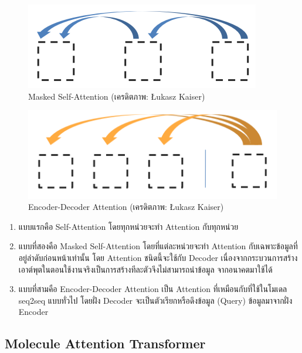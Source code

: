\begin{figure}[htbp]
    \centering
    \includegraphics[width=0.6\linewidth]{fig/attention_2_masked.png}
    \caption{Masked Self-Attention (เครดิตภาพ: Łukasz Kaiser)}
    \label{fig:masked_self_attention}
\end{figure}

\begin{figure}[htbp]
    \centering
    \includegraphics[width=0.6\linewidth]{fig/attention_3_enc-dec.png}
    \caption{Encoder-Decoder Attention (เครดิตภาพ: Łukasz Kaiser)}
    \label{fig:enc_dec_attention}
\end{figure}

\begin{enumerate}
    \item แบบแรกคือ Self-Attention โดยทุกหน่วยจะทำ Attention กับทุกหน่วย

    \item แบบที่สองคือ Masked Self-Attention โดยที่แต่ละหน่วยจะทำ Attention กับเฉพาะข้อมูลที่อยู่ลำดับก่อนหน้าเท่านั้น 
    โดย Attention ชนิดนี้จะใช้กับ Decoder เนื่องจากกระบวนการสร้างเอาต์พุตในตอนใช้งานจริงเป็นการสร้างทีละตัวจึงไม่สามารถนำข้อมูล%
    จากอนาคตมาใช้ได้

    \item แบบที่สามคือ Encoder-Decoder Attention เป็น Attention ที่เหมือนกับที่ใช้ในโมเดล seq2seq แบบทั่วไป โดยฝั่ง Decoder 
    จะเป็นตัวเรียกหรือดึงข้อมูล (Query) ข้อมูลมาจากฝั่ง Encoder
\end{enumerate}

\subsection{Molecule Attention Transformer}
\label{ssec:mol_transformer}

